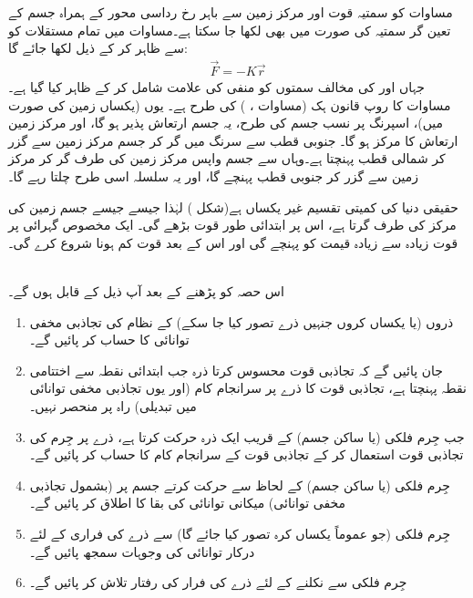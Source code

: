   مساوات  کو سمتیہ  قوت   اور مرکز زمین سے باہر رخ رداسی محور کے ہمراہ جسم کے  تعین گر سمتیہ  کی صورت میں  بھی لکھا جا سکتا ہے۔مساوات  میں تمام مستقلات  کو   سے ظاہر کر کے ذیل لکھا جائے گا:
  \begin{align}\label{مساوات_تجاذب_زمین_اندر_ت}
  \vec{F}=-K\vec{r}
  \end{align}
  جہاں  اور  کی مخالف سمتوں کو  منفی کی علامت  شامل کر  کے ظاہر کیا گیا ہے۔ مساوات   کا روپ قانون ہک (مساوات ، )  کی طرح ہے۔ یوں (یکساں زمین کی صورت میں)،  اسپرنگ پر نسب جسم کی طرح، یہ جسم ارتعاش پذیر ہو گا، اور  مرکز زمین    ارتعاش کا مرکز ہو گا۔ جنوبی قطب سے سرنگ میں گر کر جسم مرکز زمین سے گزر کر شمالی قطب پہنچتا ہے۔وہاں سے جسم واپس مرکز زمین کی طرف گر کر مرکز زمین سے گزر کر  جنوبی قطب پہنچے گا، اور یہ سلسلہ اسی طرح چلتا رہے گا۔
  
  حقیقی دنیا  کی کمیتی تقسیم غیر  یکساں  ہے(شکل ) لہٰذا جیسے جیسے جسم زمین کی مرکز کی طرف گرتا ہے، اس پر ابتدائی طور قوت بڑھے گی۔ ایک مخصوص گہرائی پر قوت زیادہ سے زیادہ قیمت کو پہنچے گی اور اس کے بعد قوت کم ہونا شروع کرے گی۔
  
  \\
  اس حصہ کو پڑھنے کے بعد آپ ذیل کے قابل ہوں گے۔
  \begin{enumerate}[1.]
  \item
  ذروں (یا یکساں کروں  جنہیں ذرے  تصور کیا جا سکے) کے نظام کی تجاذبی مخفی توانائی  کا حساب کر پائیں گے۔
  \item
  جان پائیں گے کہ  تجاذبی قوت محسوس کرتا  ذرہ  جب ابتدائی نقطہ سے اختتامی نقطہ  پہنچتا ہے، تجاذبی  قوت کا ذرے پر سرانجام کام (اور یوں تجاذبی مخفی توانائی میں تبدیلی) راہ پر منحصر نہیں۔
  \item
جب    جِرم فلکی  (یا     ساکن  جسم) کے قریب ایک ذرہ حرکت کرتا ہے،  ذرے پر   جِرم  کی تجاذبی قوت  استعمال کر کے  تجاذبی  قوت  کے سرانجام کام کا  حساب کر پائیں گے۔
\item
جِرم فلکی (یا  ساکن جسم) کے  لحاظ سے حرکت کرتے جسم پر (بشمول تجاذبی مخفی توانائی)     میکانی توانائی کی بقا کا اطلاق کر پائیں گے۔
\item
جِرم فلکی (جو عموماً یکساں کرہ تصور کیا جائے گا) سے   ذرے کی فراری   کے لئے  درکار توانائی کی وجوہات   سمجھ  پائیں گے۔
\item
جِرم فلکی سے   نکلنے  کے لئے ذرے کی   فرار کی  رفتار تلاش کر پائیں گے۔
  \end{enumerate}
  
